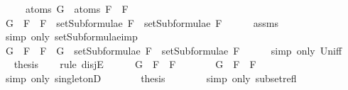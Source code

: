 \begin{isabellebody}
\ \ \ \ \ {\isachardoublequoteopen}atoms\ G\ {\isasymsubseteq}\ atoms\ {\isacharparenleft}F{}\ \isactrlbold {\isasymrightarrow}\ F{}{\isacharparenright}{\isachardoublequoteclose}\isanewline
%
\isadelimproof
%
\endisadelimproof
%
\isatagproof
{}\isamarkupfalse%
\ {\isacharminus}\isanewline
\ \ \isamarkupfalse%
\ {\isachardoublequoteopen}G\ {\isasymin}\ {\isacharbraceleft}F{}\ \isactrlbold {\isasymrightarrow}\ F{}{\isacharbraceright}\ {\isasymunion}\ {\isacharparenleft}setSubformulae\ F{}\ {\isasymunion}\ setSubformulae\ F{}{\isacharparenright}{\isachardoublequoteclose}\isanewline
\ \ \ \ \isamarkupfalse%
\ assms{\isacharparenleft}{}{\isacharparenright}\ \isanewline
\ \ \ \ \isamarkupfalse%
\ {\isacharparenleft}simp\ only{\isacharcolon}\ setSubformulae{\isacharunderscore}imp{\isacharparenright}\isanewline
\ \ \isamarkupfalse%
\ \isamarkupfalse%
\ {\isachardoublequoteopen}G\ {\isasymin}\ {\isacharbraceleft}F{}\ \isactrlbold {\isasymrightarrow}\ F{}{\isacharbraceright}\ {\isasymor}\ G\ {\isasymin}\ setSubformulae\ F{}\ {\isasymunion}\ setSubformulae\ F{}{\isachardoublequoteclose}\isanewline
\ \ \ \ \isamarkupfalse%
\ {\isacharparenleft}simp\ only{\isacharcolon}\ Un{\isacharunderscore}iff{\isacharparenright}\isanewline
\ \ \isamarkupfalse%
\ \isamarkupfalse%
\ {\isacharquery}thesis\isanewline
\ \ \isamarkupfalse%
\ {\isacharparenleft}rule\ disjE{\isacharparenright}\isanewline
\ \ \ \ \isamarkupfalse%
\ {\isachardoublequoteopen}G\ {\isasymin}\ {\isacharbraceleft}F{}\ \isactrlbold {\isasymrightarrow}\ F{}{\isacharbraceright}{\isachardoublequoteclose}\isanewline
\ \ \ \ \isamarkupfalse%
\ \isamarkupfalse%
\ {\isachardoublequoteopen}G\ {\isacharequal}\ F{}\ \isactrlbold {\isasymrightarrow}\ F{}{\isachardoublequoteclose}\isanewline
\ \ \ \ \ \ \isamarkupfalse%
\ {\isacharparenleft}simp\ only{\isacharcolon}\ singletonD{\isacharparenright}\isanewline
\ \ \ \ \isamarkupfalse%
\ \isamarkupfalse%
\ {\isacharquery}thesis\isanewline
\ \ \ \ \ \ \isamarkupfalse%
\ {\isacharparenleft}simp\ only{\isacharcolon}\ subset{\isacharunderscore}refl{\isacharparenright}\isanewline
\ \ \isamarkupfalse%

\end{isabellebody}
